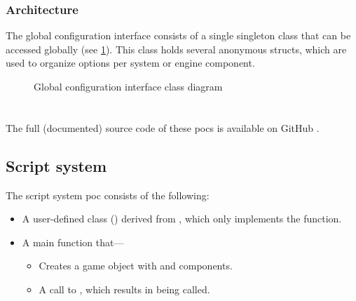 \documentclass{projdoc}
\begin{document}
\subsubsection{Architecture}
\label{sec:config:architecture}

The global configuration interface consists of a single singleton class that can be
accessed globally (see \cref{fig:class-config}). This class holds several anonymous
structs, which are used to organize options per system or engine component.

\begin{figure}
	\centering
	\caption{Global configuration interface class diagram}
	\label{fig:class-config}
\end{figure}



\appendix

\section{}

The full (documented) source code of these \glspl{poc} is available on GitHub
\autocite{crepe:code-repo}.

\subsection{Script system}
\label{poc:scripts}

The script system \gls{poc} \autocite[script example]{crepe:code-repo} consists of
the following:\noparbreak
\begin{itemize}
	\item A user-defined class () derived from
		, which only implements the  function.
	\item A main function that---
		\begin{itemize}
			\item Creates a game object with  and
				 components.
			\item A call to , which results in
				 being called.
		\end{itemize}
\end{itemize}
\end{document}
